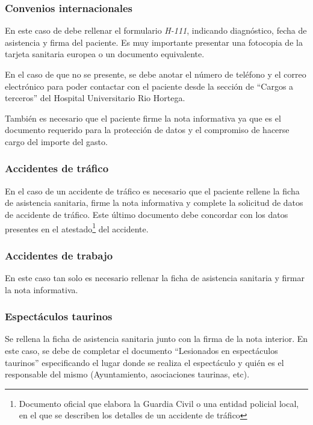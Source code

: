 \subsubsection{Convenios internacionales}

En este caso de debe rellenar el formulario \textit{H-111}, indicando diagnóstico, fecha de asistencia y firma del paciente.
Es muy importante presentar una fotocopia de la tarjeta sanitaria europea o un documento equivalente.

En el caso de que no se presente, se debe anotar el número de teléfono y el correo electrónico para poder contactar con el paciente desde la sección de ``Cargos a terceros'' del Hospital Universitario Rio Hortega.

También es necesario que el paciente firme la nota informativa ya que es el documento requerido para la protección de datos y el compromiso de hacerse cargo del importe del gasto.

\subsubsection{Accidentes de tráfico}

En el caso de un accidente de tráfico es necesario que el paciente rellene la ficha de asistencia sanitaria, firme la nota informativa y complete la solicitud de datos de accidente de tráfico.
Este último documento debe concordar con los datos presentes en el atestado\footnote{Documento oficial que elabora la Guardia Civil o una entidad policial local, en el que se describen los detalles de un accidente de tráfico} del accidente.

\subsubsection{Accidentes de trabajo}

En este caso tan solo es necesario rellenar la ficha de asistencia sanitaria y firmar la nota informativa.

\subsubsection{Espectáculos taurinos}

Se rellena la ficha de asistencia sanitaria junto con la firma de la nota interior.
En este caso, se debe de completar el documento ``Lesionados en espectáculos taurinos'' especificando el lugar donde se realiza el espectáculo y quién es el responsable del mismo (Ayuntamiento, asociaciones taurinas, etc).

